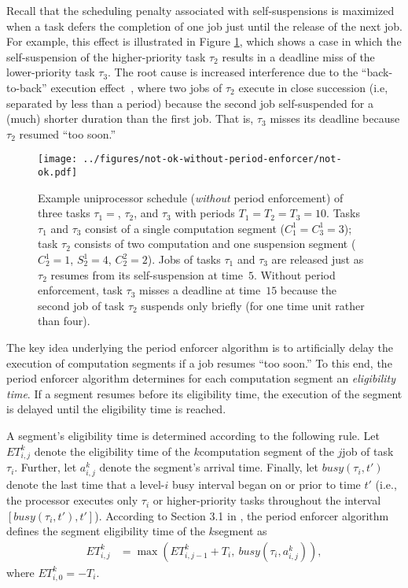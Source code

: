 Recall that the scheduling penalty associated with self-suspensions is maximized when a task defers the completion of one job just until the release of the next job. For example, this effect is illustrated in Figure \ref{fig:not-ok-without-period-enforcement}, which shows a case in which the self-suspension of the higher-priority task $\tau_2$  results in a deadline miss of the lower-priority task $\tau_3$. The root cause is increased interference due to the ``back-to-back'' execution effect~\cite{LSS:87,LSST:91,Ra:90,ABRTW:93,SLS:95}, where two jobs of $\tau_2$ execute in close succession (i.e, separated by less than a period) because the second job self-suspended for a (much) shorter duration than the first job. That is, $\tau_3$ misses its deadline because $\tau_2$ resumed ``too soon.''

\ifpaper
\begin{figure}[t]
  \centering
  \texttt{[image: ../figures/not-ok-without-period-enforcer/not-ok.pdf]}
  \caption{Example uniprocessor schedule (\emph{without} period enforcement) of three tasks $\tau_1 = $, $\tau_2$, and $\tau_3$ with periods $T_1 = T_2 = T_3 = 10$. Tasks $\tau_1$ and $\tau_3$ consist of a single computation segment ($C_1^1 = C_3^1 = 3$); task $\tau_2$ consists of two computation and one suspension segment ($C_2^1 = 1$, $S_2^1 = 4$, $C_2^2 = 2$). Jobs of tasks $\tau_1$ and $\tau_3$ are released just as $\tau_2$ resumes from its self-suspension at time~$5$. Without period enforcement, task $\tau_3$ misses a deadline at time~$15$ because the second job of  task $\tau_2$ suspends only briefly (for one time unit rather than four).}
  \label{fig:not-ok-without-period-enforcement}
  \end{figure}
\fi


The key idea underlying the period enforcer algorithm is to artificially delay the execution of computation segments if a job resumes ``too soon.'' To this end,  the period enforcer algorithm determines for each computation segment an \emph{eligibility time}. If a segment resumes  before its eligibility time, the execution of the segment is delayed until the eligibility time is reached.

A segment's eligibility time is determined according to the following rule. Let $ET_{i,j}^k$ denote the eligibility time of the $k$\xth computation segment of the $j$\xth job of task $\tau_i$. Further, let $a^k_{i,j}$ denote the segment's arrival time. Finally, let $\mathit{busy}(\tau_i, t')$ denote the last time that a level-$i$ busy interval began on or prior to time $t'$ (i.e., the processor executes only $\tau_i$ or higher-priority tasks throughout the interval $[\mathit{busy}(\tau_i, t'), t']$). According to Section 3.1 in \cite{Raj:suspension1991}, the period enforcer algorithm defines the segment eligibility time of the $k$\xth segment as
\begin{align}\label{eq:ET-def}
	ET_{i,j}^k & = \max\left(ET_{i,j-1}^k + T_i,\ \mathit{busy}(\tau_i, a^k_{i,j})\right),
\end{align}
where $ET_{i,0}^k = -T_i$. 

